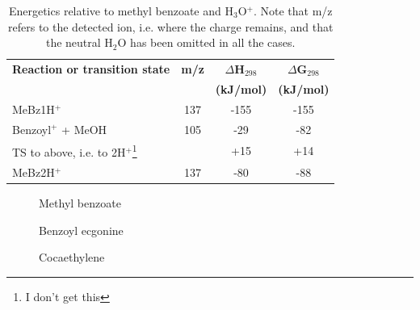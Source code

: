 \begin{table}%
\centering
\caption[Energetics relative to methyl benzoate and H$_3$O$^+$.]{Energetics relative to methyl benzoate and H$_3$O$^+$. Note that m/z refers to the detected ion, i.e. where the charge remains, and that the neutral H$_2$O has been omitted in all the cases.}
\label{tb:mb2}
\begin{tabular}{lccc}
\toprule
\textbf{Reaction or transition state}	&\textbf{m/z} &\textbf{$\Delta$H$_{298}$} &\textbf{$\Delta$G$_{298}$}\\
& &	\textbf{(kJ/mol)} &\textbf{(kJ/mol)} \\  \toprule
MeBz1H$^+$   					&	137	& -155  & -155   \\ \midrule
Benzoyl$^+$ + MeOH				&	105	& -29  & -82   \\ \midrule
TS to above, i.e. to 2H$^+$\footnote[2]{I don't get this}&		& +15  	& +14\\ \midrule
MeBz2H$^+$ 						&	137	& -80  & -88   \\ 
\bottomrule
\end{tabular}
\end{table}

\begin{figure}%
\begin{center}
\end{center}
\caption{Methyl benzoate}
\end{figure}


\begin{figure}%
\centering
{}
\caption{Benzoyl ecgonine}\label{fig:be}
\end{figure}


\begin{figure}%
\centering
{}\label{fig:cocet}
\caption{Cocaethylene}
\end{figure}




